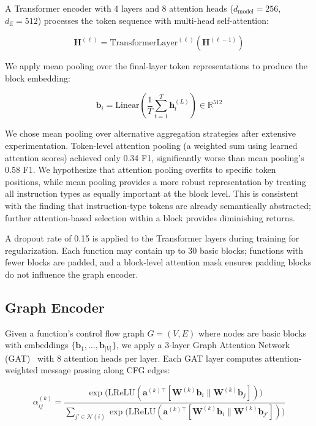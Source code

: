 \documentclass[sigconf,nonacm]{acmart}
\begin{document}
A Transformer encoder with 4 layers and 8 attention heads ($d_\text{model}{=}256$, $d_\text{ff}{=}512$) processes the token sequence with multi-head self-attention:

\begin{equation}
    \mathbf{H}^{(\ell)} = \text{TransformerLayer}^{(\ell)}(\mathbf{H}^{(\ell-1)})
\end{equation}

We apply mean pooling over the final-layer token representations to produce the block embedding:

\begin{equation}
    \mathbf{b}_i = \text{Linear}\left(\frac{1}{T}\sum_{t=1}^{T} \mathbf{h}_t^{(L)}\right) \in \mathbb{R}^{512}
\end{equation}

We chose mean pooling over alternative aggregation strategies after extensive experimentation. Token-level attention pooling (a weighted sum using learned attention scores) achieved only 0.34 F1, significantly worse than mean pooling's 0.58 F1. We hypothesize that attention pooling overfits to specific token positions, while mean pooling provides a more robust representation by treating all instruction types as equally important at the block level. This is consistent with the finding that instruction-type tokens are already semantically abstracted; further attention-based selection within a block provides diminishing returns.

A dropout rate of 0.15 is applied to the Transformer layers during training for regularization. Each function may contain up to 30 basic blocks; functions with fewer blocks are padded, and a block-level attention mask ensures padding blocks do not influence the graph encoder.

\subsection{Graph Encoder}
\label{sec:graph_encoder}

Given a function's control flow graph $G = (V, E)$ where nodes are basic blocks with embeddings $\{\mathbf{b}_1, \ldots, \mathbf{b}_{|V|}\}$, we apply a 3-layer Graph Attention Network (GAT)~\cite{velivckovic2018graph} with 8 attention heads per layer. Each GAT layer computes attention-weighted message passing along CFG edges:

{\small
\begin{equation}
    \alpha_{ij}^{(k)} = \frac{\exp\!\bigl(\text{LReLU}(\mathbf{a}^{(k)\top}[\mathbf{W}^{(k)}\mathbf{b}_i \| \mathbf{W}^{(k)}\mathbf{b}_j])\bigr)}{\sum_{j' \in \mathcal{N}(i)} \exp\!\bigl(\text{LReLU}(\mathbf{a}^{(k)\top}[\mathbf{W}^{(k)}\mathbf{b}_i \| \mathbf{W}^{(k)}\mathbf{b}_{j'}])\bigr)}
\end{equation}
}
\end{document}

